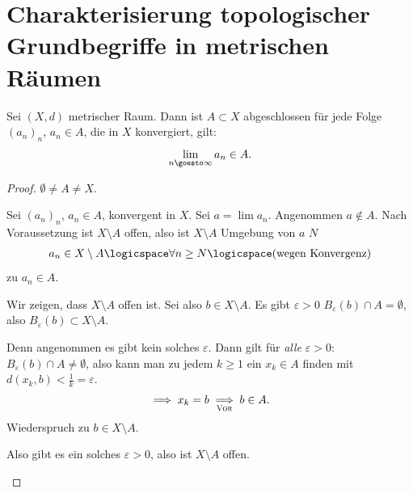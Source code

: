 \section*{Charakterisierung topologischer Grundbegriffe in metrischen Räumen}
\begin{lemma}\label{abgeschlossenheit:folgenkonvergenzkriterium}
    Sei \( (X,d) \) metrischer Raum. 
    Dann ist \( A\subset X \) abgeschlossen \tiff für jede Folge \( (a_n)_n \), \( a_n\in A \), die in \( X \) konvergiert, gilt:
    \begin{align*}
        \lim\limits_{n \goesto \infty} a_n\in A.
    \end{align*}
\end{lemma}
\begin{proof}
    \Obda \( \emptyset\neq A\neq X \).
    
    \begin{proofenumerate}
        
        \item[\hin] Sei \( (a_n)_n \), \( a_n\in A \), konvergent in \( X \).
         Sei \( a=\lim a_n \). Angenommen \( a\notin A \). Nach Voraussetzung ist \( X\setminus A \) offen, also ist \( X\setminus A \) Umgebung von \( a \) \timplies \texists \( N \) \sd
         \begin{align*}
             a_n \in X\setminus A \logicspace \forall n\geq N \logicspace (\text{wegen Konvergenz})
         \end{align*}
         \contra zu \( a_n\in A \).
         
         \item[\rueck] Wir zeigen, dass \( X\setminus A \) offen ist.
         Sei also \( b\in X \setminus A \). Es gibt \( \varepsilon>0 \) \sd \( B_\varepsilon(b)\cap A=\emptyset \), also \( B_\varepsilon(b)\subset X\setminus A \). 
         
         Denn angenommen es gibt kein solches \( \varepsilon \). 
         Dann gilt für \emph{alle} \( \varepsilon>0 \):
         \( B_\varepsilon(b)\cap A\neq \emptyset \), also kann man zu jedem \( k\geq 1 \) ein \( x_k\in A \) finden mit \( d(x_k, b)<\frac{1}{k}=\varepsilon \).
         \begin{align*}
             \implies x_k=b\underset{\text{\textsc{Vor}}}{\implies} b\in A.
         \end{align*}
         \contra Wiederspruch zu \( b\in X\setminus A \).

         Also gibt es ein solches \( \varepsilon>0 \), also ist \( X\setminus A \) offen.
    \end{proofenumerate}
    
\end{proof}
